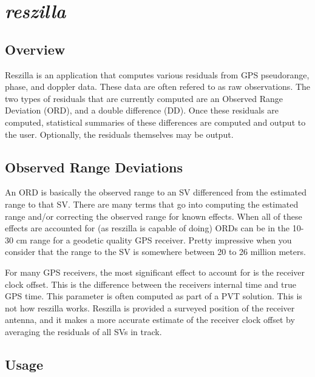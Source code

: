 %
%

\section{\emph{reszilla}}
\subsection{Overview}
Reszilla is an application that computes various residuals from GPS
pseudorange, phase, and doppler data. These data are often refered to
as raw observations. The two types of residuals that are currently
computed are an Observed Range Deviation (ORD), and a double
difference (DD). Once these residuals are computed, statistical
summaries of these differences are computed and output to the
user. Optionally, the residuals themselves may be output.

\subsection{Observed Range Deviations}
An ORD is basically the observed range to an SV differenced from the
estimated range to that SV. There are many terms that go into
computing the estimated range and/or correcting the observed range for
known effects. When all of these effects are accounted for (as
reszilla is capable of doing) ORDs can be in the 10-30 cm range for a
geodetic quality GPS receiver. Pretty impressive when you consider
that the range to the SV is somewhere between 20 to 26 million meters.

For many GPS receivers, the most significant effect to account for is the receiver
clock offset. This is the difference between the receivers internal time and true
GPS time. This parameter is often computed as part of a PVT solution. This is not
how reszilla works. Reszilla is provided a surveyed position of the receiver
antenna, and it makes a more accurate estimate of the receiver clock offset by
averaging the residuals of all SVs in track.

\subsection{Usage}


